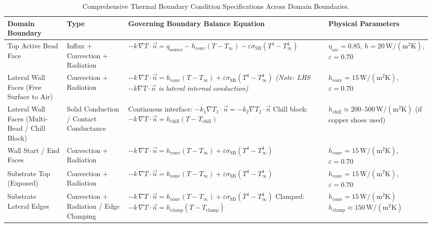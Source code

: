\documentclass[10pt,a4paper]{article}
\begin{document}
\begin{table}[h!]
\centering
\small
\caption{Comprehensive Thermal Boundary Condition Specifications Across Domain Boundaries.}
\label{tab:thermal_bc}
\vspace{0.4em}
\begin{tabularx}{\textwidth}{p{3.2cm} p{2.4cm} X p{3.2cm}}
\toprule
\textbf{Domain Boundary} & \textbf{Type} & \textbf{Governing Boundary Balance Equation} & \textbf{Physical Parameters} \\
\midrule
Top Active Bead Face & Influx + Convection + Radiation & $-k\,\nabla T \cdot \vec{n} = q_{\mathrm{source}} - h_{\mathrm{conv}}(T - T_\infty) - \varepsilon\sigma_{\mathrm{SB}}(T^4 - T_\infty^4)$ & $\eta_{\mathrm{arc}} = 0.85$, $h = 20\,\mathrm{W/(m^2K)}$, $\varepsilon = 0.70$ \\
\addlinespace[0.3em]
Lateral Wall Faces (Free Surface to Air) & Convection + Radiation & $-k\,\nabla T \cdot \vec{n} = h_{\mathrm{conv}}(T - T_\infty) + \varepsilon\sigma_{\mathrm{SB}}(T^4 - T_\infty^4)$ \newline \textit{(Note: LHS $-k\nabla T\cdot\vec{n}$ is lateral internal conduction)} & $h_{\mathrm{conv}} = 15\,\mathrm{W/(m^2K)}$, $\varepsilon = 0.70$ \\
\addlinespace[0.3em]
Lateral Wall Faces (Multi-Bead / Chill Block) & Solid Conduction / Contact Conductance & Continuous interface: $-k_1\nabla T_1\cdot\vec{n} = -k_2\nabla T_2\cdot\vec{n}$ \newline Chill block: $-k\,\nabla T \cdot \vec{n} = h_{\mathrm{chill}}(T - T_{\mathrm{chill}})$ & $h_{\mathrm{chill}} \approx 200\text{--}500\,\mathrm{W/(m^2K)}$ (if copper shoes used) \\
\addlinespace[0.3em]
Wall Start / End Faces & Convection + Radiation & $-k\,\nabla T \cdot \vec{n} = h_{\mathrm{conv}}(T - T_\infty) + \varepsilon\sigma_{\mathrm{SB}}(T^4 - T_\infty^4)$ & $h_{\mathrm{conv}} = 15\,\mathrm{W/(m^2K)}$, $\varepsilon = 0.70$ \\
\addlinespace[0.3em]
Substrate Top (Exposed) & Convection + Radiation & $-k\,\nabla T \cdot \vec{n} = h_{\mathrm{conv}}(T - T_\infty) + \varepsilon\sigma_{\mathrm{SB}}(T^4 - T_\infty^4)$ & $h_{\mathrm{conv}} = 15\,\mathrm{W/(m^2K)}$, $\varepsilon = 0.70$ \\
\addlinespace[0.3em]
Substrate Lateral Edges & Convection + Radiation / Edge Clamping & $-k\,\nabla T \cdot \vec{n} = h_{\mathrm{conv}}(T - T_\infty) + \varepsilon\sigma_{\mathrm{SB}}(T^4 - T_\infty^4)$ \newline Clamped: $-k\,\nabla T \cdot \vec{n} = h_{\mathrm{clamp}}(T - T_{\mathrm{clamp}})$ & $h_{\mathrm{conv}} = 15\,\mathrm{W/(m^2K)}$ \newline $h_{\mathrm{clamp}} \approx 150\,\mathrm{W/(m^2K)}$ \\

\end{tabularx}
\end{table}
\end{document}
